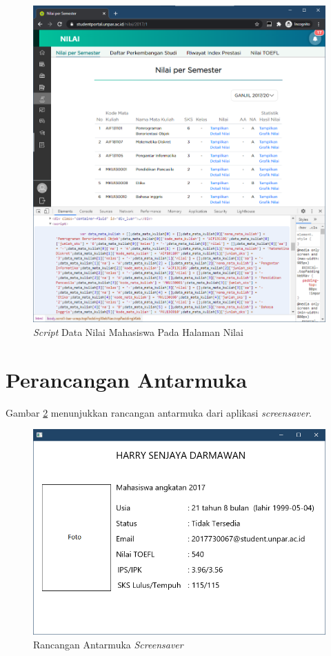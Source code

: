 \begin{enumerate}
\begin{itemize}
    	\begin{figure}[H]
        	\centering
        	\includegraphics[scale=0.5]{Gambar/nilai_script.png}
        	\caption{\textit{Script} Data Nilai Mahasiswa Pada Halaman Nilai}
        	\label{fig:4_nilai_script}
        \end{figure}
	\end{itemize}
\end{enumerate}

\section{Perancangan Antarmuka}
Gambar \ref{fig:4_antarmuka} menunjukkan rancangan antarmuka dari aplikasi \textit{screensaver}.
\begin{figure}[H]
	\centering
	\includegraphics[scale=0.5]{Gambar/UI.png}
	\caption{Rancangan Antarmuka \textit{Screensaver}}
	\label{fig:4_antarmuka}
\end{figure}

